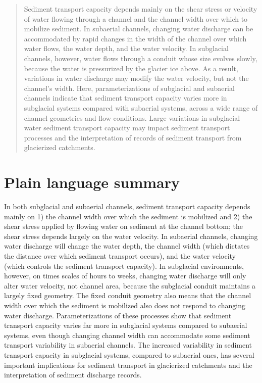 \documentclass[draft]{agujournal2019}
\begin{document}

\begin{abstract} %
Sediment transport capacity depends mainly on the shear stress or velocity of water flowing through a channel and the channel width over which to mobilize sediment.
In subaerial channels, changing water discharge can be accommodated by rapid changes in the width of the channel over which water flows, the water depth, and the water velocity.
In subglacial channels, however, water flows through a conduit whose size evolves  slowly, because the water is pressurized by the glacier ice above.
As a result, variations in water discharge may modify the water velocity, but not the channel's width.
Here, parameterizations of subglacial and subaerial channels indicate that sediment transport capacity varies more in subglacial systems compared with subaerial systems, across a wide range of channel geometries and flow conditions.
Large variations in subglacial water sediment transport capacity may impact sediment transport processes and the interpretation of records of sediment transport from glacierized catchments.

  
\end{abstract}

\section*{Plain language summary} %
In both subglacial and subaerial channels, sediment transport capacity depends mainly on 1) the channel width over which the sediment is mobilized  and 2) the shear stress applied by flowing water on sediment at the channel bottom; the shear stress depends largely on the water velocity.
In subaerial channels, changing water discharge will  change the water depth,  the channel width (which dictates the distance  over which sediment transport  occurs), and the  water velocity (which controls the sediment transport capacity).
 In subglacial environments, however, on times scales of hours to weeks, changing water discharge will only alter  water velocity, not channel area, because the subglacial conduit maintains a largely fixed geometry.
The fixed conduit geometry also means that the channel width over which the sediment is  mobilized also does not respond to changing water discharge.
Parameterizations of these processes show that sediment transport capacity varies far more in subglacial systems compared to subaerial systems, even though changing channel width can accommodate some sediment transport variability in subaerial channels.
The increased variability in sediment transport capacity in subglacial systems, compared to subaerial ones, has several important implications for sediment transport in glacierized catchments and the interpretation of sediment discharge records.
\end{document}
